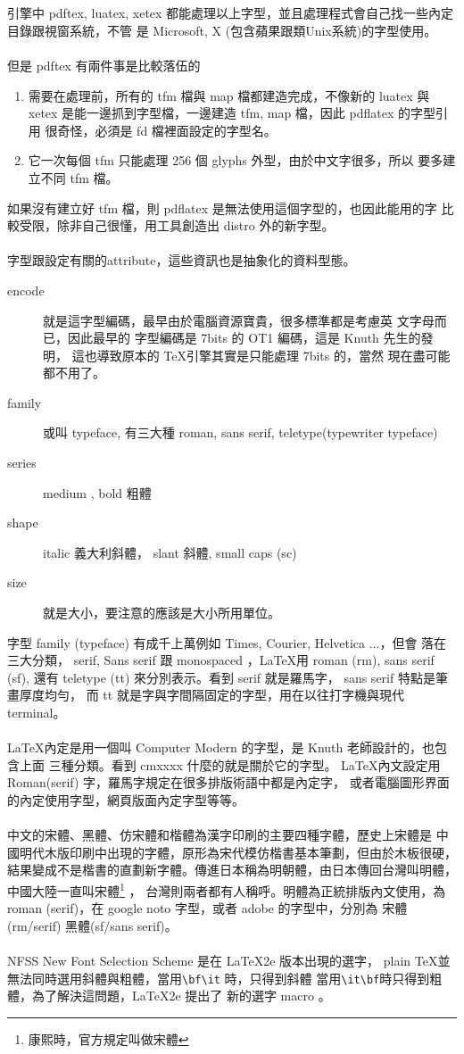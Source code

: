 \\\\
引擎中 pdftex, luatex, xetex 都能處理以上字型，並且處理程式會自己找一些內定
目錄跟視窗系統，不管 是 Microsoft, X (包含蘋果跟類Unix系統)的字型使用。
\\\\
但是 pdftex 有兩件事是比較落伍的
\begin{enumerate}
\item 需要在處理前，所有的 tfm 檔與 map 檔都建造完成，不像新的 luatex
與 xetex 是能一邊抓到字型檔，一邊建造 tfm, map 檔，因此 pdflatex 的字型引用
很奇怪，必須是 fd 檔裡面設定的字型名。
\item 它一次每個 tfm 只能處理 256 個 glyphs 外型，由於中文字很多，所以
要多建立不同 tfm 檔。
\end{enumerate}
如果沒有建立好 tfm 檔，則 pdflatex 是無法使用這個字型的，也因此能用的字
比較受限，除非自己很懂，用工具創造出 distro 外的新字型。
\\\\
字型跟設定有關的attribute，這些資訊也是抽象化的資料型態。
\begin{description}
\item [encode] 就是這字型編碼，最早由於電腦資源寶貴，很多標準都是考慮英
文字母而已，因此最早的 \MF{} 字型編碼是 7bits 的 OT1 編碼，這是 Knuth
 先生的發明， 這也導致原本的 \TeX 引擎其實是只能處理 7bits 的，當然
現在盡可能都不用了。
\item [family] 或叫 typeface, 有三大種 roman, sans serif, teletype(typewriter typeface)
\item [series] medium , bold 粗體
\item [shape] italic 義大利斜體， slant 斜體, small caps (sc)
\item [size] 就是大小，要注意的應該是大小所用單位。
\end{description}
字型 family (typeface) 有成千上萬例如 Times, Courier, Helvetica ...，但會
落在三大分類， serif, Sans serif 跟 monospaced ，\LaTeX 用 roman (rm), 
sans serif (sf), 還有 teletype (tt) 來分別表示。看到 serif 就是羅馬字，
sans serif 特點是筆畫厚度均勻，
而 tt 就是字與字間隔固定的字型，用在以往打字機與現代 terminal。
\\\\
\LaTeX 內定是用一個叫 Computer Modern 的字型，是 Knuth 老師設計的，也包含上面
三種分類。看到 cmxxxx 什麼的就是關於它的字型。
\LaTeX 內文設定用 Roman(serif) 字，羅馬字規定在很多排版術語中都是內定字，
或者電腦圖形界面的內定使用字型，網頁版面內定字型等等。
\\\\
中文的宋體、黑體、仿宋體和楷體為漢字印刷的主要四種字體，歷史上宋體是
中國明代木版印刷中出現的字體，原形為宋代模仿楷書基本筆劃，但由於木板很硬，
結果變成不是楷書的直劃新字體。傳進日本稱為明朝體，由日本傳回台灣叫明體，
中國大陸一直叫宋體\footnote{康熙時，官方規定叫做宋體} ，
台灣則兩者都有人稱呼。明體為正統排版內文使用，為
roman (serif)，在 google noto 字型，或者 adobe 的字型中，分別為
宋體(rm/serif) 黑體(sf/sans serif)。
\\\\
NFSS New Font Selection Scheme 是在 \LaTeX 2e 版本出現的選字，
plain \TeX 並無法同時選用斜體與粗體，當用\verb=\bf\it= 時，只得到斜體
當用\verb=\it\bf=時只得到粗體，為了解決這問題，\LaTeX 2e 提出了
新的選字 macro 。
